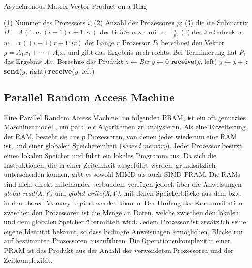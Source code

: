 \begin{algorithm}
    \caption{Asynchronous Matrix Vector Product on a Ring \cite[S.18]{jaja}}
    \begin{algorithmic}[1]
    \Require (1) Nummer des Prozessors $i$; (2) Anzahl der Prozessoren $p$;
    (3) die $i$te Submatrix $B = A(1:n, (i-1)r+1:ir)$ der Größe $n \times r$
        mit $r = \frac{n}{p}$;
    (4) der $i$te Subvektor $w = x((i-1)r+1:ir)$ der Länge $r$
    \Ensure Prozessor $P_i$ berechnet den Vektor $y = A_1x_1 + \cdots + A_ix_i$
    und gibt das Ergebnis nach rechts. Bei Terminierung hat $P_1$ das
    Ergebnis $Ax$.
    \State Berechne das Prudukt $z \gets Bw$
        \State $y \gets 0$
    \Else
        \State \textbf{receive}($y$, left)
    \EndIf
    \State $y \gets y + z$
    \State \textbf{send}($y$, right)
        \State \textbf{receive}($y$, left)
    \EndIf
    \end{algorithmic}
\end{algorithm}


\subsection{Parallel Random Access Machine}
Eine Parallel Random Access Machine, im folgenden PRAM, ist ein oft genutztes
Maschinenmodell, um parallele Algorithmen zu analysieren.
Als eine Erweiterung der RAM, besteht sie aus $p$ Prozessoren, von denen jeder
wiederum eine RAM ist, und einer globalen Speichereinheit
(\emph{shared memory}).
Jeder Prozessor besitzt einen lokalen Speicher und führt ein lokales Programm
aus.
Da sich die Instruktionen, die in einer Zeiteinheit ausgeführt werden,
grundsätzlich unterscheiden können, gibt es sowohl MIMD als auch SIMD PRAM.
Die RAMs sind nicht direkt miteinander verbunden, verfügen jedoch über die
Anweisungen \emph{global read(X,Y)} und \emph{global write(X,Y)}, mit denen
Speicherblöcke aus dem bzw. in den shared Memory kopiert werden können.
Der Umfang der Kommunikation zwischen den Prozessoren ist die Menge an Daten,
welche zwischen den lokalen und dem globalen Speicher übermittelt wird.
Jedem Prozessor ist zusätzlich seine eigene Identität bekannt, so dass bedingte
Anweisungen ermöglichen, Blöcke nur auf bestimmten Prozessoren auszuführen.
Die Operationenkomplexität einer PRAM ist das Produkt aus der Anzahl der
verwendeten Prozessoren und der Zeitkomplexität.
\cite[S.9ff.]{jaja}


